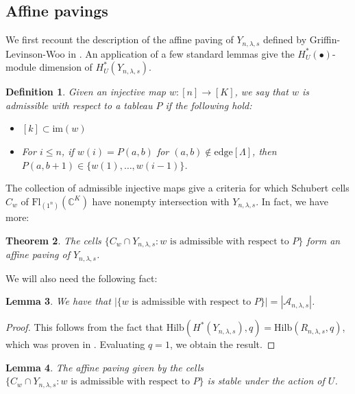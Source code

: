 \documentclass[11pt]{amsart}
\numberwithin{equation}{section}
\newtheorem{theorem}{Theorem}[section]
\newtheorem{lemma}[theorem]{Lemma}
\newtheorem{definition}[theorem]{Definition}
\theoremstyle{definition}
\newcommand{\Hilb}{{\mathrm{Hilb}}}
\newcommand{\AAA}{{\mathcal{A}}}
\newcommand{\CC}{{\mathbb{C}}}
\newcommand{\im}{\text{im}}
\newcommand{\edge}{\text{edge}}
\newcommand{\Fl}{\text{Fl}}
\begin{document}
\subsection{Affine pavings}

We first recount the description of the affine paving of $Y_{n,\lambda,s}$ defined by Griffin-Levinson-Woo in \cite{GLW}. An application of a few standard lemmas give the $H^*_U(\bullet)$-module dimension of $H^*_U(Y_{n,\lambda,s})$.

\begin{definition}\cite{GLW}\label{def: P-admissible}
    Given an injective map $w: [n] \to [K]$, we say that $w$ is \emph{admissible} with respect to a tableau $P$ if the following hold:
    \begin{itemize}
        \item $[k] \subset \im(w)$
        \item For $i \leq n$, if $w(i) = P(a,b)$ for $(a,b) \not\in \edge[\Lambda]$, then $P(a,b+1) \in \{w(1),\dots,w(i-1)\}$. 
    \end{itemize}
\end{definition}

The collection of admissible injective maps give a criteria for which Schubert cells $C_w$ of $\Fl_{(1^n)}(\CC^K)$ have nonempty intersection with $Y_{n,\lambda,s}$. In fact, we have more:

\begin{theorem}\cite{GLW}
    The cells $\{ C_w \cap Y_{n,\lambda,s} : w \text{ is admissible with respect to }P\}$ form an affine paving of $Y_{n,\lambda,s}$.
\end{theorem}

We will also need the following fact:

\begin{lemma}\cite{GLW}\label{lem: wsandAnls}
    We have that $|\{w \text{ is admissible with respect to }P\}| = |\AAA_{n,\lambda,s}|$.
\end{lemma}

\begin{proof}
    This follows from the fact that $\Hilb(H^*(Y_{n,\lambda,s}),q) = \Hilb(R_{n,\lambda,s},q)$, which was proven in \cite{GLW}. Evaluating $q = 1$, we obtain the result.
\end{proof}

\begin{lemma}
    The affine paving given by the cells $\{ C_w \cap Y_{n,\lambda,s} : w \text{ is admissible with respect to } P\}$ is stable under the action of $U$.
\end{lemma}
\end{document}
